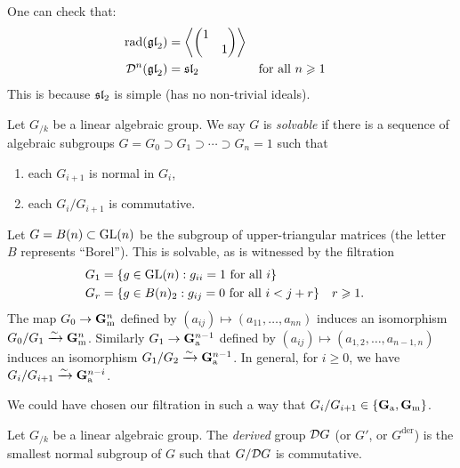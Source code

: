 \begin{example}
One can check that: 
\begin{align*}
  \operatorname{rad}(\mathfrak{gl}_2) &= \left\langle \begin{pmatrix} 1 \\ & 1 \end{pmatrix}\right\rangle \\
  \mathcal{D}^n(\mathfrak{gl}_2) &= \mathfrak{sl}_2 && \text{for all }n\geqslant 1 
\end{align*}
This is because $\mathfrak{sl}_2$ is simple (has no non-trivial ideals). 
\end{example}

\begin{definition}
Let $G_{/k}$ be a linear algebraic group. We say $G$ is \emph{solvable} if 
there is a sequence of algebraic subgroups 
$G=G_0\supset G_1\supset \cdots \supset G_n=1$ such that 
\begin{enumerate}
  \item each $G_{i+1}$ is normal in $G_i$, 
  \item each $G_i/G_{i+1}$ is commutative. 
\end{enumerate}
\end{definition}

\begin{example}
Let $G=B(n)\subset \operatorname{GL}(n)$ be the subgroup of upper-triangular matrices (the 
letter $B$ represents ``Borel''). This is solvable, as is witnessed by the 
filtration 
\begin{align*}
  G_1 &= \{g\in \operatorname{GL}(n):g_{i i}=1\text{ for all }i\} \\
  G_r &= \{g\in B(n)_2:g_{i j}=0\text{ for all }i<j+r\} && r\geqslant 1 .
\end{align*}
The map $G_0\to \mathbf{G}_\mathrm{m}^n$ defined by $(a_{i j})\mapsto (a_{11},\dots,a_{nn})$ 
induces an isomorphism $G_0/G_1\xrightarrow\sim \mathbf{G}_\mathrm{m}^n$. Similarly 
$G_1\to \mathbf{G}_\mathrm{a}^{n-1}$ defined by $(a_{i j})\mapsto (a_{1,2},\dots,a_{n-1,n})$ 
induces an isomorphism $G_1/G_2\xrightarrow\sim \mathbf{G}_\mathrm{a}^{n-1}$. In general, for $i\geqslant 0$, 
we have $G_{i}/G_{i+1} \xrightarrow\sim \mathbf{G}_\mathrm{a}^{n-i}$. 

We could have chosen our filtration in such a way that 
$G_i/G_{i+1}\in \{\mathbf{G}_\mathrm{a},\mathbf{G}_\mathrm{m}\}$. 
\end{example}

\begin{definition}
Let $G_{/k}$ be a linear algebraic group. The \emph{derived} group 
$\mathcal{D} G$ (or $G'$, or $G^\mathrm{der}$) is the smallest normal subgroup of 
$G$ such that $G/\mathcal{D} G$ is commutative. 
\end{definition}

